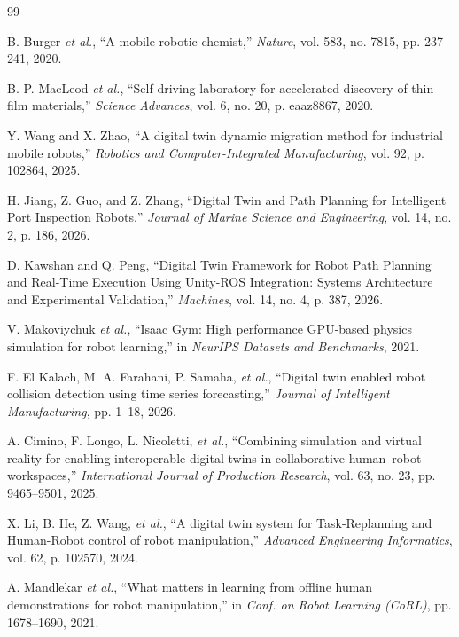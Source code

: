 \documentclass[journal,twocolumn]{IEEEtran}
\begin{document}
\begin{thebibliography}{99}

B. Burger \textit{et al.}, ``A mobile robotic chemist,'' \textit{Nature}, vol. 583, no. 7815, pp. 237--241, 2020.

B. P. MacLeod \textit{et al.}, ``Self-driving laboratory for accelerated discovery of thin-film materials,'' \textit{Science Advances}, vol. 6, no. 20, p. eaaz8867, 2020.

Y. Wang and X. Zhao, ``A digital twin dynamic migration method for industrial mobile robots,'' \textit{Robotics and Computer-Integrated Manufacturing}, vol. 92, p. 102864, 2025.

H. Jiang, Z. Guo, and Z. Zhang, ``Digital Twin and Path Planning for Intelligent Port Inspection Robots,'' \textit{Journal of Marine Science and Engineering}, vol. 14, no. 2, p. 186, 2026.

D. Kawshan and Q. Peng, ``Digital Twin Framework for Robot Path Planning and Real-Time Execution Using Unity-ROS Integration: Systems Architecture and Experimental Validation,'' \textit{Machines}, vol. 14, no. 4, p. 387, 2026.

V. Makoviychuk \textit{et al.}, ``Isaac Gym: High performance GPU-based physics simulation for robot learning,'' in \textit{NeurIPS Datasets and Benchmarks}, 2021.

F. El Kalach, M. A. Farahani, P. Samaha, \textit{et al.}, ``Digital twin enabled robot collision detection using time series forecasting,'' \textit{Journal of Intelligent Manufacturing}, pp. 1--18, 2026.

A. Cimino, F. Longo, L. Nicoletti, \textit{et al.}, ``Combining simulation and virtual reality for enabling interoperable digital twins in collaborative human--robot workspaces,'' \textit{International Journal of Production Research}, vol. 63, no. 23, pp. 9465--9501, 2025.

X. Li, B. He, Z. Wang, \textit{et al.}, ``A digital twin system for Task-Replanning and Human-Robot control of robot manipulation,'' \textit{Advanced Engineering Informatics}, vol. 62, p. 102570, 2024.

A. Mandlekar \textit{et al.}, ``What matters in learning from offline human demonstrations for robot manipulation,'' in \textit{Conf. on Robot Learning (CoRL)}, pp. 1678--1690, 2021.


\end{thebibliography}
\end{document}
